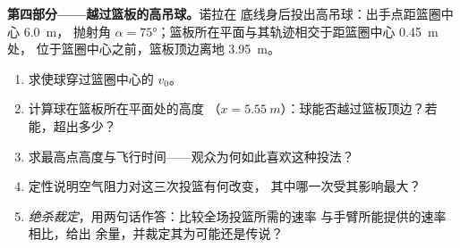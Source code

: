 \begin{problem}
\medskip\noindent\textbf{第四部分——越过篮板的高吊球。}诺拉在
底线身后投出高吊球：出手点距篮圈中心 \qty{6.0}{m}，
抛射角 $\alpha = \ang{75}$；篮板所在平面与其轨迹相交于距篮圈中心 \qty{0.45}{m} 处，
位于篮圈中心之前，篮板顶边离地 \qty{3.95}{m}。
\begin{enumerate}[resume]
  \item 求使球穿过篮圈中心的 $v_0$。
  \item 计算球在篮板所在平面处的高度
        （$x = \qty{5.55}{m}$）：球能否越过篮板顶边？若能，超出多少？
  \item 求最高点高度与飞行时间——观众为何如此喜欢这种投法？
  \item 定性说明空气阻力对这三次投篮有何改变，
        其中哪一次受其影响最大？
  \item \emph{绝杀裁定}，用两句话作答：比较全场投篮所需的速率
        与手臂所能提供的速率相比，给出
        余量，并裁定其为可能还是传说？
\end{enumerate}
\end{problem}
